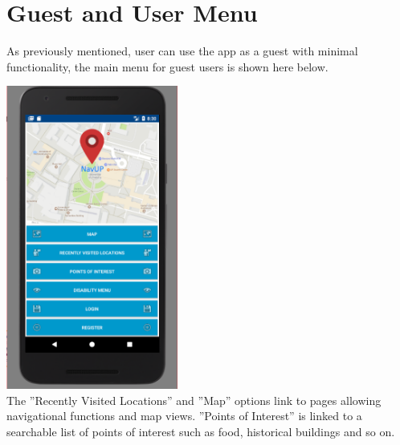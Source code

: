 \documentclass{article}
\begin{document}
\newpage
\section{Guest and User Menu}
	As previously mentioned, user can use the app as a guest with minimal functionality, the main menu for guest users is shown here below.
	\\
	\par
	\includegraphics[height=10cm]{navupmenu.png}
	\\
	The ''Recently Visited Locations'' and ''Map'' options link to pages allowing navigational functions and map views. ''Points of Interest'' is linked to a searchable list of points of interest such as food, historical buildings and so on.

	
\newpage
\end{document}
